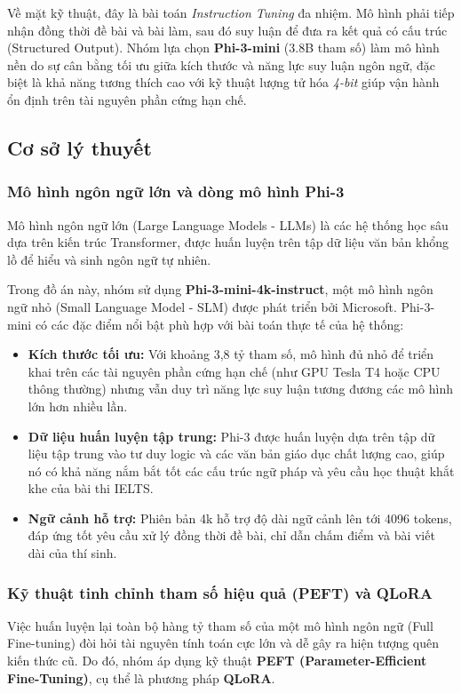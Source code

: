 Về mặt kỹ thuật, đây là bài toán \textit{Instruction Tuning} đa nhiệm. Mô hình phải tiếp nhận đồng thời đề bài và bài làm, sau đó suy luận để đưa ra kết quả có cấu trúc (Structured Output). Nhóm lựa chọn \textbf{Phi-3-mini} (3.8B tham số) \cite{phi3_microsoft} làm mô hình nền do sự cân bằng tối ưu giữa kích thước và năng lực suy luận ngôn ngữ, đặc biệt là khả năng tương thích cao với kỹ thuật lượng tử hóa \textit{4-bit} giúp vận hành ổn định trên tài nguyên phần cứng hạn chế.

\subsection{Cơ sở lý thuyết}

\subsubsection{Mô hình ngôn ngữ lớn và dòng mô hình Phi-3}
Mô hình ngôn ngữ lớn (Large Language Models - LLMs) là các hệ thống học sâu dựa trên kiến trúc Transformer, được huấn luyện trên tập dữ liệu văn bản khổng lồ để hiểu và sinh ngôn ngữ tự nhiên. 

Trong đồ án này, nhóm sử dụng \textbf{Phi-3-mini-4k-instruct}, một mô hình ngôn ngữ nhỏ (Small Language Model - SLM) được phát triển bởi Microsoft. Phi-3-mini có các đặc điểm nổi bật phù hợp với bài toán thực tế của hệ thống:
\begin{itemize}
    \item \textbf{Kích thước tối ưu:} Với khoảng 3,8 tỷ tham số, mô hình đủ nhỏ để triển khai trên các tài nguyên phần cứng hạn chế (như GPU Tesla T4 hoặc CPU thông thường) nhưng vẫn duy trì năng lực suy luận tương đương các mô hình lớn hơn nhiều lần.
    \item \textbf{Dữ liệu huấn luyện tập trung:} Phi-3 được huấn luyện dựa trên tập dữ liệu tập trung vào tư duy logic và các văn bản giáo dục chất lượng cao, giúp nó có khả năng nắm bắt tốt các cấu trúc ngữ pháp và yêu cầu học thuật khắt khe của bài thi IELTS.
    \item \textbf{Ngữ cảnh hỗ trợ:} Phiên bản 4k hỗ trợ độ dài ngữ cảnh lên tới 4096 tokens, đáp ứng tốt yêu cầu xử lý đồng thời đề bài, chỉ dẫn chấm điểm và bài viết dài của thí sinh.
\end{itemize}

\subsubsection{Kỹ thuật tinh chỉnh tham số hiệu quả (PEFT) và QLoRA}
Việc huấn luyện lại toàn bộ hàng tỷ tham số của một mô hình ngôn ngữ (Full Fine-tuning) đòi hỏi tài nguyên tính toán cực lớn và dễ gây ra hiện tượng quên kiến thức cũ. Do đó, nhóm áp dụng kỹ thuật \textbf{PEFT (Parameter-Efficient Fine-Tuning)}, cụ thể là phương pháp \textbf{QLoRA}.

